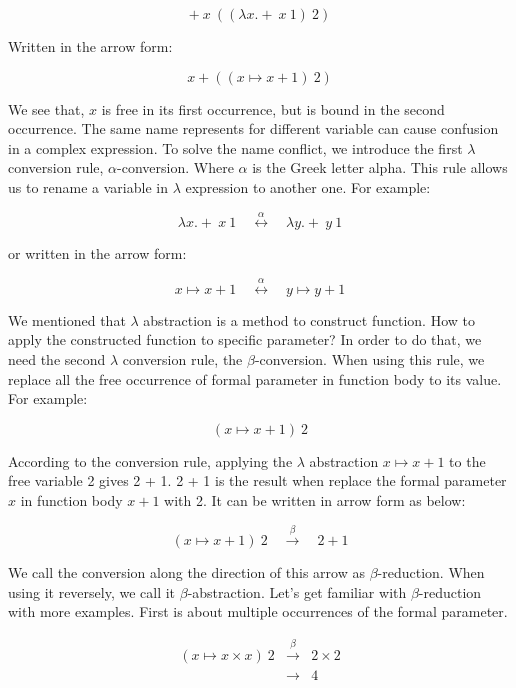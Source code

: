\documentclass[b5paper]{article}
\begin{document}
\[
+\ x\ ((\lambda x . +\ x\ 1)\ 2)
\]

Written in the arrow form:

\[
x + ((x \mapsto x + 1)\ 2)
\]

We see that, $x$ is free in its first occurrence, but is bound in the second occurrence. The same name represents for different variable can cause confusion in a complex expression. To solve the name conflict, we introduce the first $\lambda$ conversion rule, $\alpha$-conversion. Where $\alpha$ is the Greek letter alpha. This rule allows us to rename a variable in $\lambda$ expression to another one. For example:

\[
\lambda x . +\ x\ 1 \quad \overset{\alpha}{\longleftrightarrow} \quad \lambda y . +\ y\ 1
\]


or written in the arrow form:

\[
x \mapsto x + 1 \quad \overset{\alpha}{\longleftrightarrow} \quad y \mapsto y + 1
\]

We mentioned that $\lambda$ abstraction is a method to construct function. How to apply the constructed function to specific parameter? In order to do that, we need the second $\lambda$ conversion rule, the $\beta$-conversion. When using this rule, we replace all the free occurrence of formal parameter in function body to its value. For example:

\[
(x \mapsto x + 1)\ 2
\]

According to the conversion rule, applying the $\lambda$ abstraction $x \mapsto x + 1$ to the free variable 2 gives 2 + 1. 2 + 1 is the result when replace the formal parameter $x$ in function body $x + 1$ with 2. It can be written in arrow form as below:

\[
(x \mapsto x + 1)\ 2 \quad \overset{\beta}{\longrightarrow} \quad 2 + 1
\]

We call the conversion along the direction of this arrow as $\beta$-reduction. When using it reversely, we call it $\beta$-abstraction. Let's get familiar with $\beta$-reduction with more examples. First is about multiple occurrences of the formal parameter.

\[
\begin{array}{rcl}
(x \mapsto x \times x)\ 2 & \overset{\beta}{\longrightarrow} & 2 \times 2 \\
                          & \longrightarrow & 4 \\
\end{array}
\]
\end{document}
